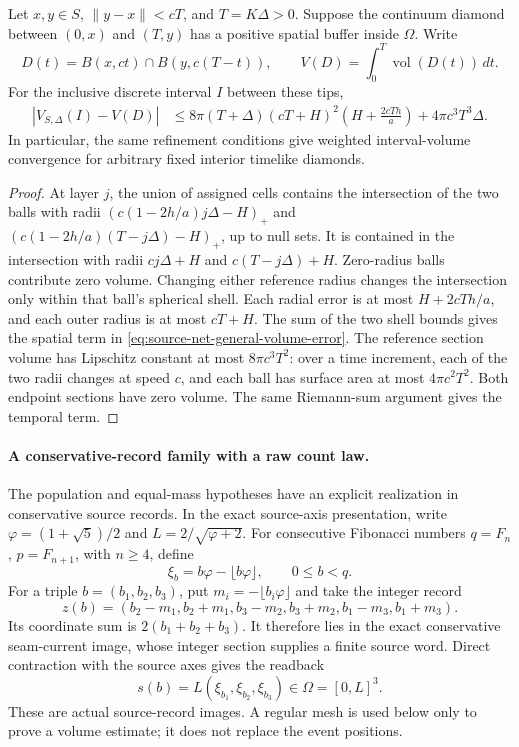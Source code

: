 \begin{proposition}
\label{cor:source-net-general-diamond}
Let $x,y\in S$, $\|y-x\|<cT$, and $T=K\Delta>0$. Suppose the
continuum diamond between $(0,x)$ and $(T,y)$ has a positive spatial
buffer inside $\Omega$. Write
\[
 D(t)=B(x,ct)\cap B(y,c(T-t)),\qquad
 V(D)=\int_0^T\operatorname{vol}(D(t))\,dt.
\]
For the inclusive discrete interval $I$ between these tips,
\begin{align}
 |V_{S,\Delta}(I)-V(D)|
 &\leq 8\pi(T+\Delta)(cT+H)^2
       \left(H+\frac{2cTh}{a}\right)
       +4\pi c^3T^3\Delta.
 \label{eq:source-net-general-volume-error}
\end{align}
In particular, the same refinement conditions give weighted interval-volume
convergence for arbitrary fixed interior timelike diamonds.
\end{proposition}
\begin{proof}
At layer $j$, the union of assigned cells contains the intersection of
the two balls with radii
$(c(1-2h/a)j\Delta-H)_+$ and
$(c(1-2h/a)(T-j\Delta)-H)_+$, up to null sets. It is contained in the
intersection with radii $cj\Delta+H$ and $c(T-j\Delta)+H$.
Zero-radius balls contribute zero volume. Changing either reference
radius changes the intersection only within that ball's spherical shell.
Each radial error is at most $H+2cTh/a$, and each outer radius is at most
$cT+H$. The sum of the two shell bounds gives the spatial term in
\eqref{eq:source-net-general-volume-error}. The reference section volume
has Lipschitz constant at most $8\pi c^3T^2$: over a time increment,
each of the two radii changes at speed $c$, and each ball has surface area
at most $4\pi c^2T^2$. Both endpoint sections have zero volume. The same
Riemann-sum argument gives the temporal term.
\end{proof}

\paragraph{A conservative-record family with a raw count law.}
The population and equal-mass hypotheses have an explicit realization in
conservative source records. In the exact source-axis presentation, write
$\varphi=(1+\sqrt5)/2$ and $L=2/\sqrt{\varphi+2}$. For consecutive Fibonacci
numbers $q=F_n$, $p=F_{n+1}$, with $n\geq4$, define
\[
 \xi_b=b\varphi-\lfloor b\varphi\rfloor,\qquad 0\leq b<q.
\]
For a triple $b=(b_1,b_2,b_3)$, put
$m_i=-\lfloor b_i\varphi\rfloor$ and take the integer record
\begin{equation}
 z(b)=(b_2-m_1,b_2+m_1,b_3-m_2,b_3+m_2,b_1-m_3,b_1+m_3).
 \label{eq:golden-source-record}
\end{equation}
Its coordinate sum is $2(b_1+b_2+b_3)$. It therefore lies in the exact
conservative seam-current image, whose integer section supplies a finite
source word. Direct contraction with the source axes gives the readback
\[
 s(b)=L(\xi_{b_1},\xi_{b_2},\xi_{b_3})\in\Omega=[0,L]^3.
\]
These are actual source-record images. A regular mesh is used below only
to prove a volume estimate; it does not replace the event positions.

